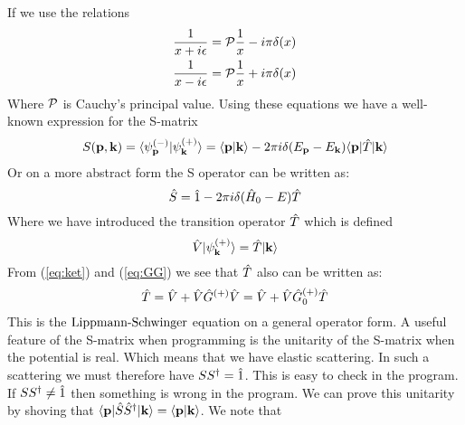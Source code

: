 %                                                 
If we use the relations
%                                                 
\begin{eqnarray}\label{eq:P1}
\inv{x+i\epsilon}={\cal P} \inv{x}-i\pi\delta (x)\\\label{eq:P2} 
\inv{x-i\epsilon}={\cal P} \inv{x}+i\pi\delta (x)
\end{eqnarray} 
%                                                 
Where ${\cal P}$ is Cauchy's principal value. Using these equations we have a well-known expression for the S-matrix
%                                                 
\begin{equation}\label{eq:Sgenerel} 
S({\bf{p}},{\bf{k}})=
\braket{\psi_{\bf{p}}^{(-)}}{\psi_{\bf{k}}^{(+)}}=\braket{{\bf{p}}}{{\bf{k}}}
-2\pi i \delta (E_{\bf p}-E_{\bf k})
\braketm{{\bf p}}{\op{T}}{\bf{k}}
\end{equation}
%                                                 
Or on a more abstract form the S operator can be written as:
%                                                 
\begin{equation}\label{eq:Smat} 
\op{S}=\op{1}-2\pi i \delta (\op{H}_0-E){\op{T}}
\end{equation}
%                                                 
Where we have introduced the transition operator $\hat{T}$ which is defined
%                                                 
\begin{equation}\label{eq:Tdef}
\op{V}\ket{\psi_{\bf k}^{(+)}}=\op{T}\ket{{\bf k}}
\end{equation}
%                                                 
From (\ref{eq:ket}) and (\ref{eq:GG}) we see that $\hat{T}$ also can be written as:
%                                                 
\begin{equation}\label{eq:TM} 
\op{T}=\op{V}+\op{V}\op{G}^{(+)}\op{V}=\op{V}+\op{V}\op{G}^{(+)}_0\op{T} 
\end{equation}
%                                                 
This is the $\text{Lippmann-Schwinger}$ equation on a general operator form.
A useful feature of the S-matrix when programming is the unitarity of the S-matrix when the potential is real.
Which means that we have elastic scattering.
In such a scattering we must therefore have $SS^{\dagger}=\hat{1}$. This is easy to check in the program.
If $SS^{\dagger}\ne \hat{1}$ then something is wrong in the program. We can prove this unitarity
by shoving  that $\langle{\bf p}|\hat{S}\hat{S}^{\dagger}|{\bf k}\rangle=
\langle{\bf p}|{\bf k}\rangle$. We note that
%                                                 
